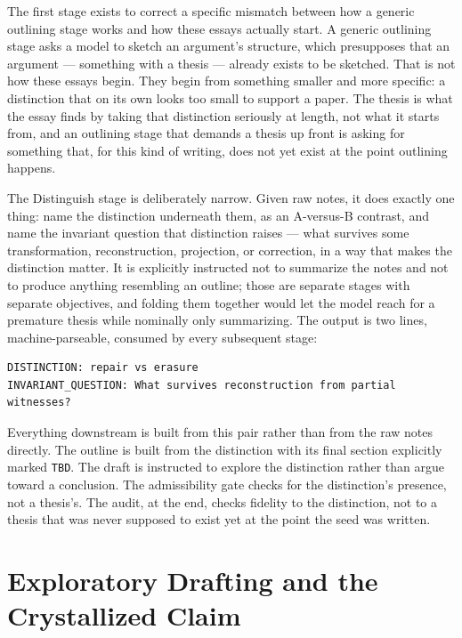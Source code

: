 \documentclass[11pt]{article}
\theoremstyle{definition}
\begin{document}
The first stage exists to correct a specific mismatch between how a
generic outlining stage works and how these essays actually start. A
generic outlining stage asks a model to sketch an argument's structure,
which presupposes that an argument --- something with a thesis ---
already exists to be sketched. That is not how these essays begin. They
begin from something smaller and more specific: a distinction that on
its own looks too small to support a paper. The thesis is what the
essay finds by taking that distinction seriously at length, not what it
starts from, and an outlining stage that demands a thesis up front is
asking for something that, for this kind of writing, does not yet
exist at the point outlining happens.

The Distinguish stage is deliberately narrow. Given raw notes, it does
exactly one thing: name the distinction underneath them, as an
A-versus-B contrast, and name the invariant question that distinction
raises --- what survives some transformation, reconstruction,
projection, or correction, in a way that makes the distinction matter.
It is explicitly instructed not to summarize the notes and not to
produce anything resembling an outline; those are separate stages with
separate objectives, and folding them together would let the model
reach for a premature thesis while nominally only summarizing. The
output is two lines, machine-parseable, consumed by every subsequent
stage:

\begin{lstlisting}[caption={Distinguish stage output format}]
DISTINCTION: repair vs erasure
INVARIANT_QUESTION: What survives reconstruction from partial witnesses?
\end{lstlisting}

Everything downstream is built from this pair rather than from the raw
notes directly. The outline is built from the distinction with its
final section explicitly marked \texttt{TBD}. The draft is instructed
to explore the distinction rather than argue toward a conclusion. The
admissibility gate checks for the distinction's presence, not a
thesis's. The audit, at the end, checks fidelity to the distinction,
not to a thesis that was never supposed to exist yet at the point the
seed was written.

\section{Exploratory Drafting and the Crystallized Claim}
\label{sec:draft}
\end{document}

